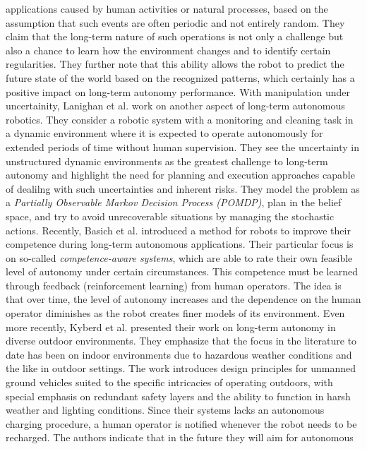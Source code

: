 \documentclass[english, master, utf8]{base/thesis_KBS}
\begin{document}
applications caused by human activities or natural processes, based on the assumption that such events are often periodic and not entirely random. They claim that the long-term
nature of such operations is not only a challenge but also a chance to learn how the environment changes and to identify certain regularities. They further note that this ability
allows the robot to predict the future state of the world based on the recognized patterns, which certainly has a positive impact on long-term autonomy performance.\newline
With manipulation under uncertainity, Lanighan et al. \cite{Lanighan:2019} work on another aspect of long-term autonomous robotics. They consider a robotic system with a monitoring and
cleaning task in a dynamic environment where it is expected to operate autonomously for extended periods of time without human supervision. They see the uncertainty in unstructured
dynamic environments as the greatest challenge to long-term autonomy and highlight the need for planning and execution approaches capable of dealilng with such uncertainties and
inherent risks. They model the problem as a \textit{Partially Observable Markov Decision Process (POMDP)}, plan in the belief space, and try to avoid unrecoverable situations by
managing the stochastic actions.\newline
Recently, Basich et al. \cite{Basich:2020} introduced a method for robots to improve their competence during long-term autonomous applications. Their particular focus is on so-called
\textit{competence-aware systems}, which are able to rate their own feasible level of autonomy under certain circumstances. This competence must be learned through feedback
(reinforcement learning) from human operators. The idea is that over time, the level of autonomy increases and the dependence on the human operator diminishes as the robot creates
finer models of its environment.\newline
Even more recently, Kyberd et al. \cite{Kyberd:2021} presented their work on long-term autonomy in diverse outdoor environments. They emphasize that the focus in the literature to date
has been on indoor environments due to hazardous weather conditions and the like in outdoor settings. The work introduces design principles for unmanned ground vehicles suited to the specific
intricacies of operating outdoors, with special emphasis on redundant safety layers and the ability to function in harsh weather and lighting conditions. Since their systems
lacks an autonomous charging procedure, a human operator is notified whenever the robot needs to be recharged. The authors indicate that in the future they will aim for autonomous
\end{document}
